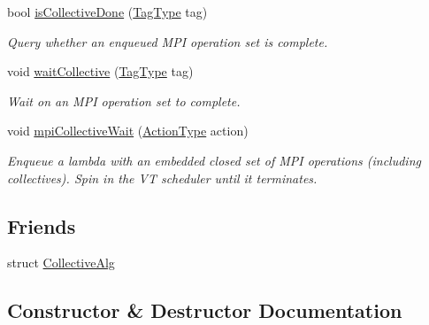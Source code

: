 \begin{DoxyCompactItemize}
bool \hyperlink{structvt_1_1collective_1_1_collective_scope_acc386201ec9e82dbe2691b4ce528a4c2}{is\+Collective\+Done} (\hyperlink{namespacevt_a84ab281dae04a52a4b243d6bf62d0e52}{Tag\+Type} tag)
\begin{DoxyCompactList}\small\item\em Query whether an enqueued M\+PI operation set is complete. \end{DoxyCompactList}\item 
void \hyperlink{structvt_1_1collective_1_1_collective_scope_afae2807ff3adc0f1d6772411168064f9}{wait\+Collective} (\hyperlink{namespacevt_a84ab281dae04a52a4b243d6bf62d0e52}{Tag\+Type} tag)
\begin{DoxyCompactList}\small\item\em Wait on an M\+PI operation set to complete. \end{DoxyCompactList}\item 
void \hyperlink{structvt_1_1collective_1_1_collective_scope_a0ef41233afe63fc9ead8431e226af193}{mpi\+Collective\+Wait} (\hyperlink{namespacevt_ae0a5a7b18cc99d7b732cb4d44f46b0f3}{Action\+Type} action)
\begin{DoxyCompactList}\small\item\em Enqueue a lambda with an embedded closed set of M\+PI operations (including collectives). Spin in the VT scheduler until it terminates. \end{DoxyCompactList}\end{DoxyCompactItemize}
\subsection*{Friends}
\begin{DoxyCompactItemize}
\item 
struct \hyperlink{structvt_1_1collective_1_1_collective_scope_aa2494f91f09e2ba6a5baae9ee9de430e}{Collective\+Alg}
\end{DoxyCompactItemize}


\subsection{Constructor \& Destructor Documentation}
\mbox{\label{structvt_1_1collective_1_1_collective_scope_ac0f36175489c3afa6d751813cb6f9286}} 
